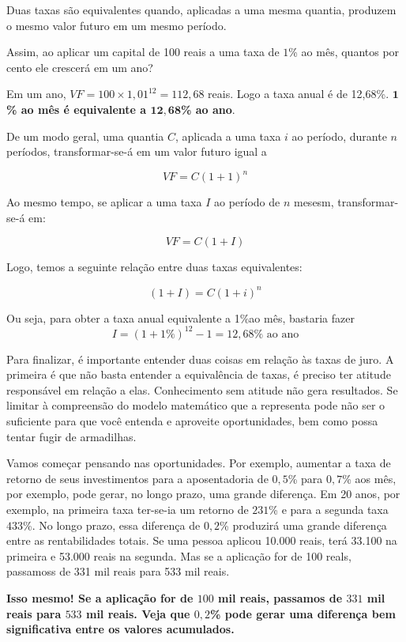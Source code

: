 \label{fin-arg-6}

Duas taxas são equivalentes quando, aplicadas a uma mesma quantia, produzem o mesmo valor futuro em um mesmo período.

Assim, ao aplicar um capital de 100 reais a uma taxa de $1$\% ao mês, quantos por cento ele crescerá em um ano?

Em um ano, $\mathit{VF} = 100\times 1{,}01^{12} = 112{,}68$ reais. Logo a taxa anual é de 12,68\%. \textbf{$\bm{1}$\% ao mês é equivalente a $\bm{12,68}$\% ao ano}.

De um modo geral, uma quantia $C$, aplicada a uma taxa $i$ ao período, durante $n$ períodos, transformar-se-á em um valor futuro igual a 

$$\mathit{VF}=C(1+1)^n$$

Ao mesmo tempo, se aplicar a uma taxa $I$ ao período de $n$ mesesm, transformar-se-á em:

$$\mathit{VF}=C(1+I)$$

Logo, temos a seguinte relação entre duas taxas equivalentes:

$$(1+I)=C(1+i)^n$$

Ou seja, para obter a taxa anual equivalente a 1\%ao mês, bastaria fazer
$$I=(1+1\%)^{12}-1=12{,}68\% \text{ ao ano}$$

Para finalizar, é importante entender duas coisas em relação às taxas de juro. A primeira é que não basta entender a equivalência de taxas, é preciso ter atitude responsável em relação a elas. Conhecimento sem atitude não gera resultados. Se limitar à compreensão do modelo matemático que a representa pode não ser o suficiente para que você entenda e aproveite oportunidades, bem como possa tentar fugir de armadilhas.

Vamos começar pensando nas oportunidades. Por exemplo, aumentar a taxa de retorno de seus investimentos para a aposentadoria de $0{,}5$\% para $0{,}7$\% aos mês, por exemplo, pode gerar, no longo prazo, uma grande diferença. Em 20 anos, por exemplo, na primeira taxa ter-se-ia um retorno de $231$\% e para a segunda taxa $433$\%. No longo prazo, essa diferença de $0{,}2$\% produzirá uma grande diferença entre as rentabilidades totais. Se uma pessoa aplicou 10.000 reais, terá 33.100 na primeira e 53.000 reais na segunda. Mas se a aplicação for de 100 reals, passamoss de 331 mil reais para 533 mil reais. 

\textbf{Isso mesmo! Se a aplicação for de $100$ mil reais, passamos de $331$ mil reais para $533$ mil reais. Veja que $0{,}2$\% pode gerar uma diferença bem significativa entre os valores acumulados.}

